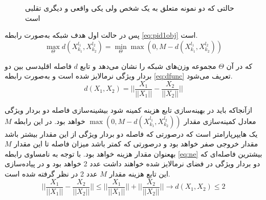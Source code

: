 \begin{figure}[ht]
 
 	\caption{حالتی که دو نمونه متعلق به یک شخص ولی یکی واقعی و دیگری تقلبی است}
 	\label{fig:pid1}
 \end{figure}

پس در حالت اول هدف شبکه به‌صورت رابطه
\ref{eq:pid1obj}
است.
\begin{equation}\label{eq:pid1obj}
	\max_{\Theta} {d( X_{k_1}^{l_1},X_{k_2}^{l_2} )} = \min_{\Theta}{\max(0,M-d( X_{k_1}^{l_1},X_{k_2}^{l_2} ))}
\end{equation}

که در آن 
$\Theta$
 مجموعه وزن‌های شبکه را نشان می‌دهد و تابع $d$ فاصله اقلیدسی بین دو بردار ویژگی نرمالایز شده است و به‌صورت رابطه 
\ref{eq:dfunc}
  تعریف می‌شود.
  \begin{equation}\label{eq:dfunc}
  	d(X_1,X_2) = ||\frac{X_1}{||X_1||}-\frac{X_2}{||X_2||}||
  \end{equation}

ازآنجا‌که باید در بهینه‌سازی تابع هزینه کمینه شود بیشینه‌سازی فاصله دو بردار ویژگی معادل کمینه‌سازی مقدار 
$\max(0,M-d( X_{k_1}^{l_1},X_{k_2}^{l_2} ))$
 خواهد بود. در این رابطه $M$ یک هایپر‌پارامتر است که در‌صورتی که فاصله دو بردار ویژگی از این مقدار بیشتر باشد مقدار خروجی صفر خواهد بود و در‌صورتی که کمتر باشد میزان فاصله تا این مقدار $M$ بهعنوان مقدار هزینه خواهد بود.
با توجه به نامساوی رابطه
\ref{eq:ne}
بیشترین فاصله‌ای که دو بردار ویژگی در فضای نرمالایز شده خواهند داشت عدد 2 خواهد بود و در پیاده‌سازی این تابع هزینه مقدار $M$ عدد 2 در نظر گرفته شده است.
  \begin{equation}\label{eq:ne}
	||\frac{X_1}{||X_1||}-\frac{X_2}{||X_2||}|| \le ||\frac{X_1}{||X_1||}||+||\frac{X_2}{||X_2||}||   \to d(X_1,X_2) \le 2
\end{equation}


